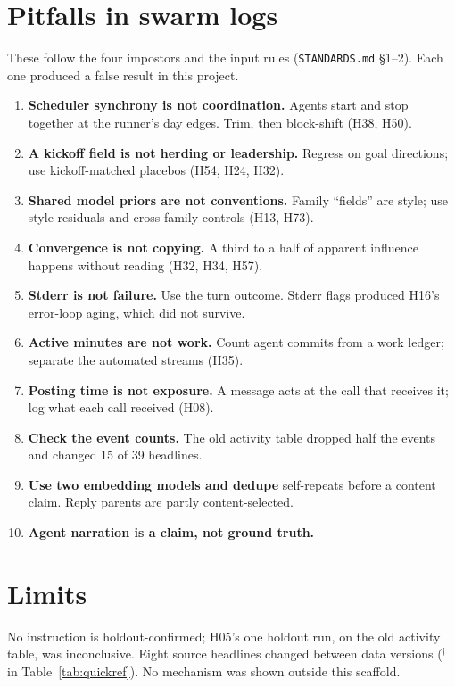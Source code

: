 \documentclass[aps,pre,reprint,10pt,nofootinbib]{revtex4-2}
\newcounter{ins}
\begin{document}
\section{Pitfalls in swarm logs}
These follow the four impostors and the input rules (\texttt{STANDARDS.md} \S1--2). Each one produced a false result in this project.
\begin{enumerate}\setlength{\itemsep}{0pt}\setlength{\parsep}{0pt}\setlength{\leftmargin}{1.2em}
\item \textbf{Scheduler synchrony is not coordination.} Agents start and stop together at the runner's day edges. Trim, then block-shift (H38, H50).
\item \textbf{A kickoff field is not herding or leadership.} Regress on goal directions; use kickoff-matched placebos (H54, H24, H32).
\item \textbf{Shared model priors are not conventions.} Family ``fields'' are style; use style residuals and cross-family controls (H13, H73).
\item \textbf{Convergence is not copying.} A third to a half of apparent influence happens without reading (H32, H34, H57).
\item \textbf{Stderr is not failure.} Use the turn outcome. Stderr flags produced H16's error-loop aging, which did not survive.
\item \textbf{Active minutes are not work.} Count agent commits from a work ledger; separate the automated streams (H35).
\item \textbf{Posting time is not exposure.} A message acts at the call that receives it; log what each call received (H08).
\item \textbf{Check the event counts.} The old activity table dropped half the events and changed 15 of 39 headlines.
\item \textbf{Use two embedding models and dedupe} self-repeats before a content claim. Reply parents are partly content-selected.
\item \textbf{Agent narration is a claim, not ground truth.}
\end{enumerate}

\section{Limits}
No instruction is holdout-confirmed; H05's one holdout run, on the old activity table, was inconclusive. Eight source headlines changed between data versions ($^\dagger$ in Table~\ref{tab:quickref}). No mechanism was shown outside this scaffold.
\end{document}
